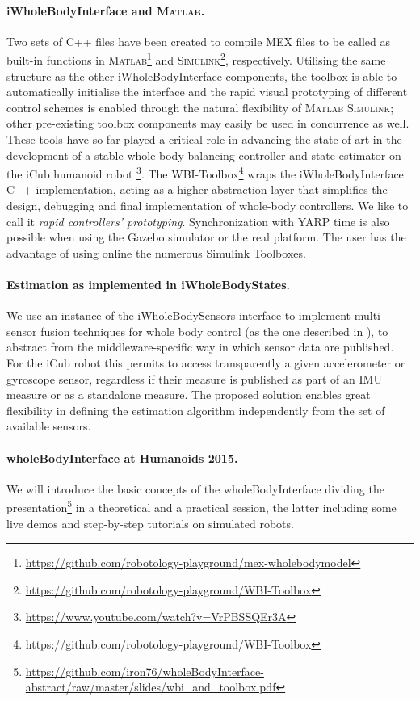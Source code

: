 \documentclass[11pt]{article}
\newcommand\textvtt[1]{{\normalfont\fontfamily{cmvtt}\selectfont #1}}
\begin{document}
\paragraph{\textvtt{iWholeBodyInterface} and \textsc{Matlab}.}

Two sets of C++ files have been created to compile {MEX} files to be called as built-in functions in \textsc{Matlab}\footnote{\protect\url{https://github.com/robotology-playground/mex-wholebodymodel}} and \textsc{Simulink}\footnote{\protect\url{https://github.com/robotology-playground/WBI-Toolbox}}, respectively. Utilising the same structure as the other \textvtt{iWholeBodyInterface} components, the toolbox is able to automatically initialise the interface and the rapid visual prototyping of different control schemes is enabled through the natural flexibility of \textsc{Matlab} \textsc{Simulink}; other pre-existing toolbox components may easily be used in concurrence as well. These tools have so far played a critical role in advancing the state-of-art in the development of a stable whole body balancing controller and state estimator on the iCub humanoid robot \footnote{\protect\url{https://www.youtube.com/watch?v=VrPBSSQEr3A}}. The WBI-Toolbox\footnote{https://github.com/robotology-playground/WBI-Toolbox} wraps the \textvtt{iWholeBodyInterface} C++ implementation, acting as a higher abstraction layer that simplifies the design, debugging and final implementation of whole-body controllers. We like to call it \emph{rapid controllers' prototyping}. Synchronization with YARP time is also possible when using the Gazebo simulator or the real platform. The user has the advantage of using online the numerous Simulink Toolboxes. 

\paragraph{Estimation as implemented in \textvtt{iWholeBodyStates}.}
We use an instance of the \textvtt{iWholeBodySensors} interface to implement multi-sensor fusion techniques for whole body control (as the one described in \cite{nori15}), to abstract from the middleware-specific way in which sensor data are published. For the iCub robot this permits to access transparently a given accelerometer or gyroscope sensor, regardless if their measure is published as part of an IMU measure or as a standalone measure. The proposed solution enables great flexibility in defining the estimation algorithm independently from the set of available sensors.

\paragraph{\textvtt{wholeBodyInterface} at Humanoids 2015.} We will introduce the basic concepts of the \textvtt{wholeBodyInterface} dividing the presentation\footnote{\protect\url{https://github.com/iron76/wholeBodyInterface-abstract/raw/master/slides/wbi_and_toolbox.pdf}} in a theoretical and a practical session, the latter including some live demos and step-by-step tutorials on simulated robots. 





\end{document}
